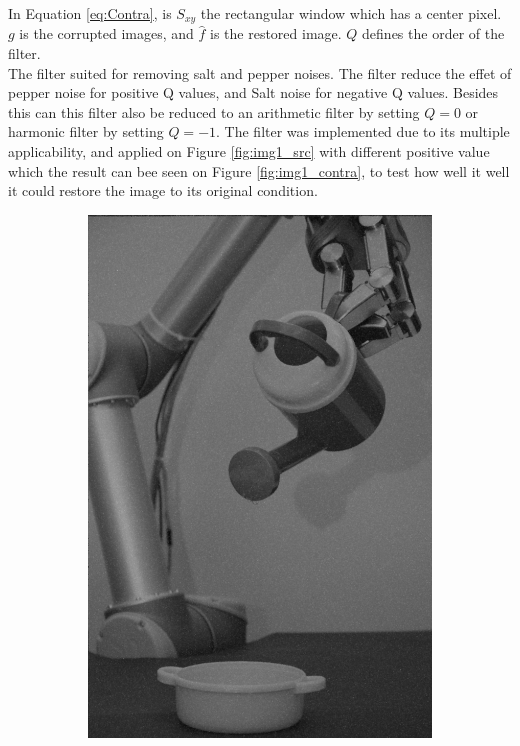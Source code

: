 In Equation \ref{eq:Contra}, is $S_{xy}$ the rectangular window which has a center pixel. $g$ is the corrupted images, and $\hat{f}$ is the restored image. $Q$ defines the order of the filter.  \\
The filter suited for removing salt and pepper noises. The filter reduce the effet of pepper noise for positive Q values, and Salt noise for negative Q values.  Besides this can this filter also be reduced to an arithmetic filter by setting $Q = 0$ or harmonic filter by setting $Q = -1$. The filter was implemented due to its multiple applicability, and applied on Figure \ref{fig:img1_src} with different positive value which the result can bee seen on Figure \ref{fig:img1_contra}, to test how well it well it could restore the image to its original condition.  

\begin{figure}[H]
    \centering
    \begin{subfigure}[b]{0.3\textwidth}
        \includegraphics[width=\textwidth]{img1/img_1_gaus_5_1.png}

\end{subfigure}
\end{figure}
